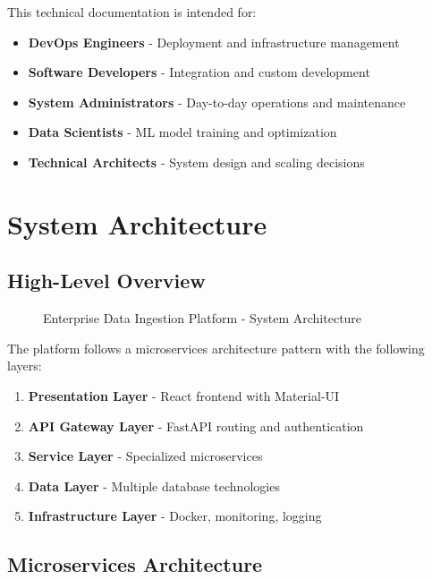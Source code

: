 \documentclass[11pt,a4paper,twoside]{book}
\begin{document}
This technical documentation is intended for:

\begin{itemize}
    \item \textbf{DevOps Engineers} - Deployment and infrastructure management
    \item \textbf{Software Developers} - Integration and custom development
    \item \textbf{System Administrators} - Day-to-day operations and maintenance
    \item \textbf{Data Scientists} - ML model training and optimization
    \item \textbf{Technical Architects} - System design and scaling decisions
\end{itemize}

\section{System Architecture}

\subsection{High-Level Overview}

\begin{figure}[h]
\centering
{}
\caption{Enterprise Data Ingestion Platform - System Architecture}
\label{fig:architecture}
\end{figure}

The platform follows a microservices architecture pattern with the following layers:

\begin{enumerate}
    \item \textbf{Presentation Layer} - React frontend with Material-UI
    \item \textbf{API Gateway Layer} - FastAPI routing and authentication
    \item \textbf{Service Layer} - Specialized microservices
    \item \textbf{Data Layer} - Multiple database technologies
    \item \textbf{Infrastructure Layer} - Docker, monitoring, logging
\end{enumerate}

\subsection{Microservices Architecture}
\end{document}
